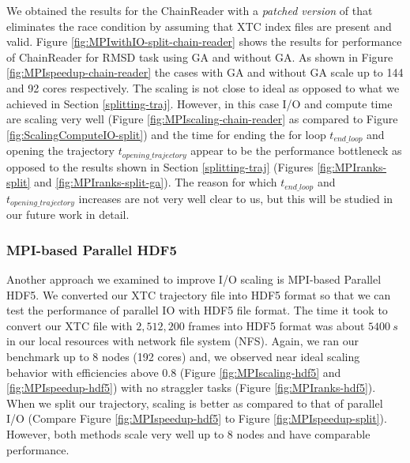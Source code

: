 We obtained the results for the ChainReader with a \emph{patched version} of  that eliminates the race condition by assuming that XTC index files are present and valid. 
Figure \ref{fig:MPIwithIO-split-chain-reader} shows the results for performance of ChainReader for RMSD task using GA and without GA. 
As shown in Figure \ref{fig:MPIspeedup-chain-reader} the cases with GA and without GA scale up to 144 and 92 cores respectively.
The scaling is not close to ideal as opposed to what we achieved in Section \ref{splitting-traj}. 
However, in this case I/O and compute time are scaling very well (Figure \ref{fig:MPIscaling-chain-reader} as compared to Figure \ref{fig:ScalingComputeIO-split}) and the time for ending the for loop $t_{end\_loop}$ and opening the trajectory $t_{opening\_trajectory}$ appear to be the performance bottleneck as opposed to the results shown in Section \ref{splitting-traj} (Figures \ref{fig:MPIranks-split} and \ref{fig:MPIranks-split-ga}). 
The reason for which $t_{end\_loop}$ and $t_{opening\_trajectory}$ increases are not very well clear to us, but this will be studied in our future work in detail.
 
\subsubsection{MPI-based Parallel HDF5}
\label{HDF5}
Another approach we examined to improve I/O scaling is MPI-based Parallel HDF5. 
We converted our XTC trajectory file into HDF5 format so that we can test the performance of parallel IO with HDF5 file format.
The time it took to convert our XTC file with $2,512,200$ frames into HDF5 format was about $5400~s$ in our local resources with network file system (NFS).
Again, we ran our benchmark up to 8 nodes (192 cores) and, we observed near ideal scaling behavior with efficiencies above 0.8 (Figure \ref{fig:MPIscaling-hdf5} and \ref{fig:MPIspeedup-hdf5}) with no straggler tasks (Figure \ref{fig:MPIranks-hdf5}).  
When we split our trajectory, scaling is better as compared to that of parallel I/O (Compare Figure \ref{fig:MPIspeedup-hdf5} to Figure \ref{fig:MPIspeedup-split}). 
However, both methods scale very well up to 8 nodes and have comparable performance.  


